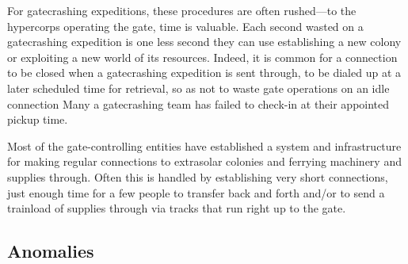 For gatecrashing expeditions, these procedures are 
often rushed—to the hypercorps operating the gate, 
time is valuable. Each second wasted on a gatecrashing
expedition is one less second they can use establishing
a new colony or exploiting a new world of its
resources. Indeed, it is common for a connection to be 
closed when a gatecrashing expedition is sent through, 
to be dialed up at a later scheduled time for retrieval, 
so as not to waste gate operations on an idle connection
Many a gatecrashing team has failed to check-in
at their appointed pickup time.

Most of the gate-controlling entities have established
a system and infrastructure for making regular
connections to extrasolar colonies and ferrying machinery
and supplies through. Often this is handled by
establishing very short connections, just enough time 
for a few people to transfer back and forth and/or to 
send a trainload of supplies through via tracks that 
run right up to the gate.

\subsection{Anomalies}

